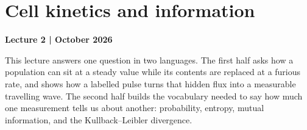 \chapter[Cell kinetics and information]{Cell kinetics and information}\label{chap:lecture02}
\noindent\textbf{Lecture 2 \enspace| October 2026}

This lecture answers one question in two languages. The first half asks how a population can sit at a steady value while its contents are replaced at a furious rate, and shows how a labelled pulse turns that hidden flux into a measurable travelling wave. The second half builds the vocabulary needed to say how much one measurement tells us about another: probability, entropy, mutual information, and the Kullback--Leibler divergence.

